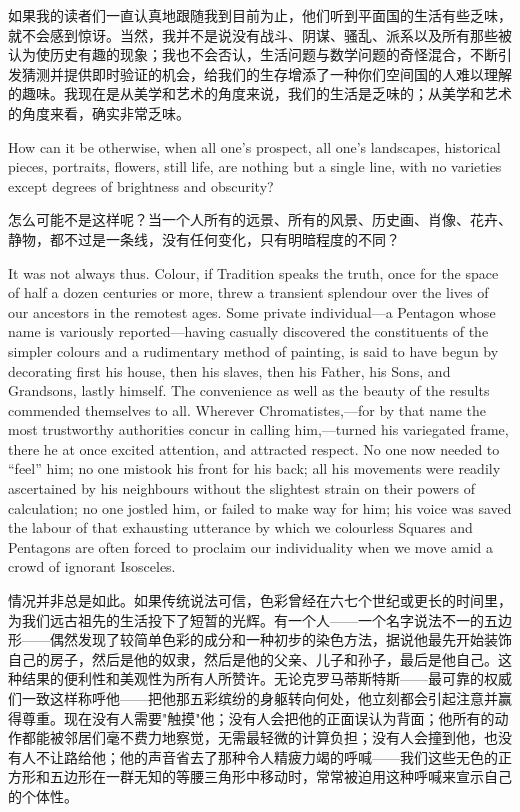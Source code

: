\documentclass[12pt,UTF8]{ctexbook}
\begin{document}
如果我的读者们一直认真地跟随我到目前为止，他们听到平面国的生活有些乏味，就不会感到惊讶。当然，我并不是说没有战斗、阴谋、骚乱、派系以及所有那些被认为使历史有趣的现象；我也不会否认，生活问题与数学问题的奇怪混合，不断引发猜测并提供即时验证的机会，给我们的生存增添了一种你们空间国的人难以理解的趣味。我现在是从美学和艺术的角度来说，我们的生活是乏味的；从美学和艺术的角度来看，确实非常乏味。

How can it be otherwise, when all one's prospect, all one's landscapes, historical pieces, portraits, flowers, still life, are nothing but a single line, with no varieties except degrees of brightness and obscurity?

怎么可能不是这样呢？当一个人所有的远景、所有的风景、历史画、肖像、花卉、静物，都不过是一条线，没有任何变化，只有明暗程度的不同？

It was not always thus. Colour, if Tradition speaks the truth, once for the space of half a dozen centuries or more, threw a transient splendour over the lives of our ancestors in the remotest ages. Some private individual---a Pentagon whose name is variously reported---having casually discovered the constituents of the simpler colours and a rudimentary method of painting, is said to have begun by decorating first his house, then his slaves, then his Father, his Sons, and Grandsons, lastly himself. The convenience as well as the beauty of the results commended themselves to all. Wherever Chromatistes,---for by that name the most trustworthy authorities concur in calling him,---turned his variegated frame, there he at once excited attention, and attracted respect. No one now needed to ``feel'' him; no one mistook his front for his back; all his movements were readily ascertained by his neighbours without the slightest strain on their powers of calculation; no one jostled him, or failed to make way for him; his voice was saved the labour of that exhausting utterance by which we colourless Squares and Pentagons are often forced to proclaim our individuality when we move amid a crowd of ignorant Isosceles.

情况并非总是如此。如果传统说法可信，色彩曾经在六七个世纪或更长的时间里，为我们远古祖先的生活投下了短暂的光辉。有一个人——一个名字说法不一的五边形——偶然发现了较简单色彩的成分和一种初步的染色方法，据说他最先开始装饰自己的房子，然后是他的奴隶，然后是他的父亲、儿子和孙子，最后是他自己。这种结果的便利性和美观性为所有人所赞许。无论克罗马蒂斯特斯——最可靠的权威们一致这样称呼他——把他那五彩缤纷的身躯转向何处，他立刻都会引起注意并赢得尊重。现在没有人需要"触摸"他；没有人会把他的正面误认为背面；他所有的动作都能被邻居们毫不费力地察觉，无需最轻微的计算负担；没有人会撞到他，也没有人不让路给他；他的声音省去了那种令人精疲力竭的呼喊——我们这些无色的正方形和五边形在一群无知的等腰三角形中移动时，常常被迫用这种呼喊来宣示自己的个体性。
\end{document}
